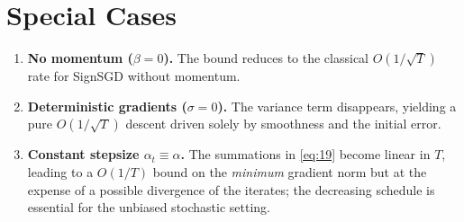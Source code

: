 \documentclass{article}
\begin{document}
\section*{Special Cases}
\begin{enumerate}[nosep]
\item \textbf{No momentum ($\beta=0$).} The bound reduces to the classical $O(1/\sqrt{T})$ rate for SignSGD without momentum.
\item \textbf{Deterministic gradients ($\sigma=0$).} The variance term disappears, yielding a pure $O(1/\sqrt{T})$ descent driven solely by smoothness and the initial error.
\item \textbf{Constant stepsize $\alpha_t\equiv\alpha$.} The summations in \eqref{eq:19} become linear in $T$, leading to a $O(1/T)$ bound on the \emph{minimum} gradient norm but at the expense of a possible divergence of the iterates; the decreasing schedule is essential for the unbiased stochastic setting.
\end{enumerate}
\end{document}
